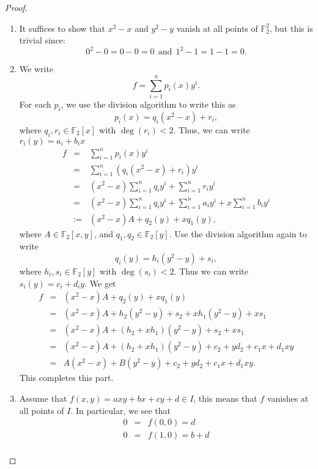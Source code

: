 \begin{proof}
    \begin{enumerate}
        \item It suffices to show that $x^2 - x$ and $y^2 - y$ vanish at all points of $\mathbb{F}_2^2$, but this is trivial since:
        $$0^2 - 0 = 0-0 = 0~~\text{and}~~1^2 - 1 = 1-1 = 0.$$
        \item We write
        $$f = \sum_{i=1}^n p_i(x) y^i.$$
        For each $p_i$, we use the division algorithm to write this as
        $$p_i(x) = q_i(x^2 - x) + r_i,$$
        where $q_i, r_i\in \mathbb{F}_2[x]$ with $\deg(r_i)<2$. Thus, we can write $r_i(y) = a_i + b_i x$
        \begin{eqnarray*}
            f 
            & = & \sum_{i=1}^n p_i(x) y^i\\
            & = & \sum_{i=1}^n (q_i (x^2 - x) + r_i)y^i\\
            & = & (x^2 - x)\sum_{i=1}^n q_i y^i + \sum_{i=1}^n r_i y^i\\
            & = & (x^2 - x)\sum_{i=1}^n q_i y^i + \sum_{i=1}^n a_i y^i + x\sum_{i=1}^n b_i y^i\\
            & := & (x^2 - x)A + q_2(y) + xq_1(y),
        \end{eqnarray*}
        where $A\in \mathbb{F}_2[x,y]$, and $q_1,q_2\in \mathbb{F}_2[y]$. Use the division algorithm again to write
        $$q_i(y) = h_i(y^2 - y) + s_i,$$
        where $h_i, s_i\in \mathbb{F}_2[y]$ with $\deg(s_i)<2$. Thus we can write $s_i(y) = c_i + d_i y$. We get
        \begin{eqnarray*}
            f
            & = & (x^2 - x)A + q_2(y) + xq_1(y)\\
            & = & (x^2 - x)A + h_2(y^2 - y) + s_2 + xh_1(y^2 - y) + xs_1\\
            & = & (x^2 - x)A + (h_2 + xh_1)(y^2 - y) + s_2 + xs_1\\
            & = & (x^2 - x)A + (h_2 + xh_1)(y^2 - y) + c_2 + yd_2 + c_1 x + d_1 xy\\
            & = & A(x^2 - x) + B(y^2 - y) + c_2 + yd_2 + c_1 x + d_1 xy.
        \end{eqnarray*}
        This completes this part.
        \item Assume that $f(x,y) = axy + bx + cy + d\in I$, this means that $f$ vanishes at all points of $I$. In particular, we see that
        \begin{eqnarray*}
            0 & = & f(0,0) = d\\
            0 & = & f(1,0) = b+d\\

\end{eqnarray*}
\end{enumerate}
\end{proof}
